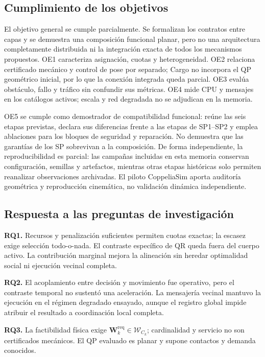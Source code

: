 \subsection{Cumplimiento de los objetivos}

El objetivo general se cumple parcialmente. Se formalizan los contratos entre
capas y se demuestra una composición funcional planar, pero no una arquitectura
completamente distribuida ni la integración exacta de todos los mecanismos
propuestos. OE1 caracteriza asignación, cuotas y heterogeneidad. OE2 relaciona
certificado mecánico y control de pose por separado; Cargo no incorpora el QP
geométrico inicial, por lo que la conexión integrada queda parcial. OE3 evalúa
obstáculo, fallo y tráfico sin confundir sus métricas. OE4 mide CPU y mensajes
en los catálogos activos; escala y red degradada no se adjudican en la memoria.

OE5 se cumple como demostrador de compatibilidad funcional: reúne las seis
etapas previstas, declara sus diferencias frente a las etapas de SP1--SP2 y emplea ablaciones
para los bloques de seguridad y reparación. No demuestra que las garantías de
los SP sobrevivan a la composición. De forma independiente, la reproducibilidad
es parcial: las campañas incluidas en esta memoria conservan configuración,
semillas y artefactos, mientras otras etapas históricas solo permiten reanalizar
observaciones archivadas. El piloto CoppeliaSim aporta auditoría geométrica y
reproducción cinemática, no validación dinámica independiente.

\subsection{Respuesta a las preguntas de investigación}

\textbf{RQ1.} Recursos y penalización suficientes permiten cuotas exactas;
la escasez exige selección todo-o-nada. El contraste específico de QR queda
fuera del cuerpo activo. La contribución marginal mejora la alineación sin
heredar optimalidad social ni ejecución vecinal completa.

\textbf{RQ2.} El acoplamiento entre decisión y movimiento fue operativo, pero el
contraste temporal no sustentó una aceleración. La mensajería vecinal mantuvo la
ejecución en el régimen degradado ensayado, aunque el registro global impide
atribuir el resultado a coordinación local completa.

\textbf{RQ3.} La factibilidad física exige
$\boldsymbol W_k^{\mathrm{req}}\in\mathcal W_{C_k}$; cardinalidad y servicio no
son certificados mecánicos. El QP evaluado es planar y supone contactos y
demanda conocidos.

